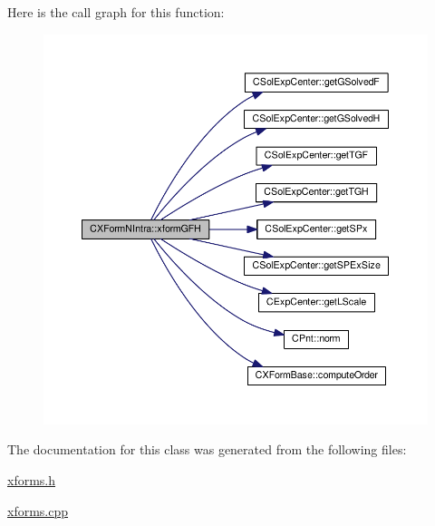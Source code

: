 Here is the call graph for this function\-:\nopagebreak
\begin{figure}[H]
\begin{center}
\leavevmode
\includegraphics[width=350pt]{classCXFormNIntra_a21c51871fbe0d7f378cd819196391eac_cgraph}
\end{center}
\end{figure}




The documentation for this class was generated from the following files\-:\begin{DoxyCompactItemize}
\item 
\hyperlink{xforms_8h}{xforms.\-h}\item 
\hyperlink{xforms_8cpp}{xforms.\-cpp}\end{DoxyCompactItemize}
